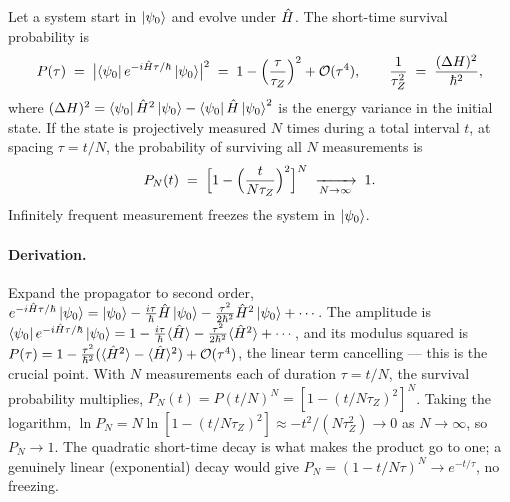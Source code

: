 \begin{statement}
\label{stmt:zeno}
Let a system start in $\ket{\psi_0}$ and evolve under $\hat{H}$. The
short-time survival probability is
\begin{equation}
\label{eq:survival-short}
P(\tau) \;=\; \bigl|\bra{\psi_0}e^{-i\hat{H}\tau/\hbar}\ket{\psi_0}\bigr|^2
\;=\; 1 - \Bigl(\frac{\tau}{\tau_Z}\Bigr)^2 + \mathcal O(\tau^4),
\qquad
\frac{1}{\tau_Z^2} \;=\; \frac{(\Delta H)^2}{\hbar^2},
\end{equation}
where $(\Delta H)^2=\bra{\psi_0}\hat{H}^2\ket{\psi_0}-\bra{\psi_0}\hat{H}\ket{\psi_0}^2$
is the energy variance in the initial state. If the state is
projectively measured $N$ times during a total interval $t$, at
spacing $\tau=t/N$, the probability of surviving all $N$
measurements is
\begin{equation}
\label{eq:zeno-survival}
P_N(t) \;=\; \Bigl[1 - \Bigl(\frac{t}{N\tau_Z}\Bigr)^2\Bigr]^N
\;\xrightarrow[N\to\infty]{}\; 1.
\end{equation}
Infinitely frequent measurement freezes the system in
$\ket{\psi_0}$.
\end{statement}

\paragraph{Derivation.}
Expand the propagator to second order,
$e^{-i\hat{H}\tau/\hbar}\ket{\psi_0}=\ket{\psi_0}-\tfrac{i\tau}{\hbar}\hat{H}\ket{\psi_0}-\tfrac{\tau^2}{2\hbar^2}\hat{H}^2\ket{\psi_0}+\cdots$.
The amplitude is
$\bra{\psi_0}e^{-i\hat{H}\tau/\hbar}\ket{\psi_0}=1-\tfrac{i\tau}{\hbar}\langle\hat{H}\rangle-\tfrac{\tau^2}{2\hbar^2}\langle\hat{H}^2\rangle+\cdots$,
and its modulus squared is
$P(\tau)=1-\tfrac{\tau^2}{\hbar^2}(\langle\hat{H}^2\rangle-\langle\hat{H}\rangle^2)+\mathcal O(\tau^4)$,
the linear term cancelling --- this is the crucial point. With
$N$ measurements each of duration $\tau=t/N$, the survival
probability multiplies, $P_N(t)=P(t/N)^N=[1-(t/N\tau_Z)^2]^N$.
Taking the logarithm, $\ln P_N = N\ln[1-(t/N\tau_Z)^2]\approx -t^2/(N\tau_Z^2)\to0$
as $N\to\infty$, so $P_N\to1$. The quadratic short-time decay is
what makes the product go to one; a genuinely linear (exponential)
decay would give $P_N=(1-t/N\tau)^N\to e^{-t/\tau}$, no freezing.

